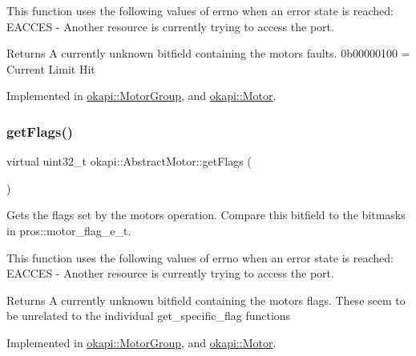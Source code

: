 This function uses the following values of errno when an error state is reached\+: E\+A\+C\+C\+ES -\/ Another resource is currently trying to access the port.

\begin{DoxyReturn}{Returns}
A currently unknown bitfield containing the motor\textquotesingle{}s faults. 0b00000100 = Current Limit Hit 
\end{DoxyReturn}


Implemented in \mbox{\hyperlink{classokapi_1_1MotorGroup_a1fece81a588e0d2ab40a08a1bcb86475}{okapi\+::\+Motor\+Group}}, and \mbox{\hyperlink{classokapi_1_1Motor_a7d16e9d0a3319a02a12476b5bec991d7}{okapi\+::\+Motor}}.

\mbox{\label{classokapi_1_1AbstractMotor_aaae44487bf20ac2e18b52ee57b7a06ad}} 
\subsubsection{\texorpdfstring{getFlags()}{getFlags()}}
{\footnotesize\ttfamily virtual uint32\+\_\+t okapi\+::\+Abstract\+Motor\+::get\+Flags (\begin{DoxyParamCaption}{ }\end{DoxyParamCaption})\hspace{0.3cm}{\ttfamily [pure virtual]}}

Gets the flags set by the motor\textquotesingle{}s operation. Compare this bitfield to the bitmasks in pros\+::motor\+\_\+flag\+\_\+e\+\_\+t.

This function uses the following values of errno when an error state is reached\+: E\+A\+C\+C\+ES -\/ Another resource is currently trying to access the port.

\begin{DoxyReturn}{Returns}
A currently unknown bitfield containing the motor\textquotesingle{}s flags. These seem to be unrelated to the individual get\+\_\+specific\+\_\+flag functions 
\end{DoxyReturn}


Implemented in \mbox{\hyperlink{classokapi_1_1MotorGroup_a5a8206be671413586f461a45132c9056}{okapi\+::\+Motor\+Group}}, and \mbox{\hyperlink{classokapi_1_1Motor_acb0097ba7ac778674efaa2c0765f6f3f}{okapi\+::\+Motor}}.

\mbox{\label{classokapi_1_1AbstractMotor_adc90f1fc8af6c34c4e833355693474bb}} 
